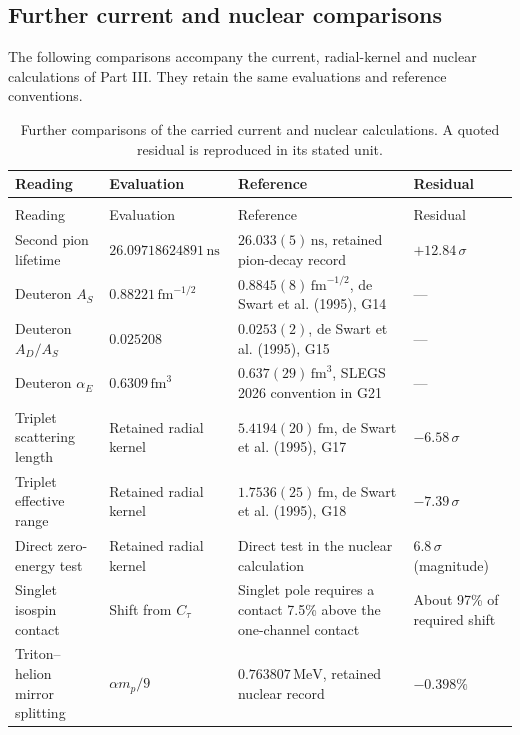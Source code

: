 \documentclass[aps,prx,onecolumn,10pt,notitlepage,nofootinbib,longbibliography]{revtex4-2}
\numberwithin{equation}{section}
\numberwithin{table}{section}
\newcommand{\MeV}{\,\mathrm{MeV}}
\newcommand{\fm}{\,\mathrm{fm}}
\begin{document}
\subsection{Further current and nuclear comparisons}
The following comparisons accompany the current, radial-kernel and nuclear
calculations of Part III. They retain the same evaluations and
reference conventions.\cite{Repository}
\begingroup\small
\setlength{\tabcolsep}{3pt}
\renewcommand{\arraystretch}{1.12}
\begin{longtable}{@{}>{\raggedright\arraybackslash}p{}>{\raggedright\arraybackslash}p{}>{\raggedright\arraybackslash}p{}>{\raggedright\arraybackslash}p{}@{}}
\caption{Further comparisons of the carried current and nuclear calculations. A quoted residual is reproduced in its stated unit.}\label{tab:furthercomparisons}\\
\toprule Reading&Evaluation&Reference&Residual\\\midrule
\endfirsthead
\multicolumn{4}{@{}l}{\textit{Table \thetable\ continued}}\\
\toprule Reading&Evaluation&Reference&Residual\\\midrule
\endhead
\bottomrule\endlastfoot
Second pion lifetime&$26.09718624891\,\mathrm{ns}$&$26.033(5)\,\mathrm{ns}$, retained pion-decay record&$+12.84\,\sigma$\\[5pt]
Deuteron $A_S$&$0.88221\,\mathrm{fm}^{-1/2}$&$0.8845(8)\,\mathrm{fm}^{-1/2}$, de Swart et al. (1995), G14&---\\[5pt]
Deuteron $A_D/A_S$&$0.025208$&$0.0253(2)$, de Swart et al. (1995), G15&---\\[5pt]
Deuteron $\alpha_E$&$0.6309\,\mathrm{fm}^{3}$&$0.637(29)\,\mathrm{fm}^{3}$, SLEGS 2026 convention in G21&---\\[5pt]
Triplet scattering length&Retained radial kernel&$5.4194(20)\fm$, de Swart et al. (1995), G17&$-6.58\,\sigma$\\[5pt]
Triplet effective range&Retained radial kernel&$1.7536(25)\fm$, de Swart et al. (1995), G18&$-7.39\,\sigma$\\[5pt]
Direct zero-energy test&Retained radial kernel&Direct test in the nuclear calculation&$6.8\,\sigma$ (magnitude)\\[5pt]
Singlet isospin contact&Shift from $C_\tau$&Singlet pole requires a contact 7.5\% above the one-channel contact&About 97\% of required shift\\[5pt]
Triton--helion mirror splitting&$\alpha m_p/9$&$0.763807\MeV$, retained nuclear record&$-0.398\%$\\[5pt]

\end{longtable}
\end{document}
